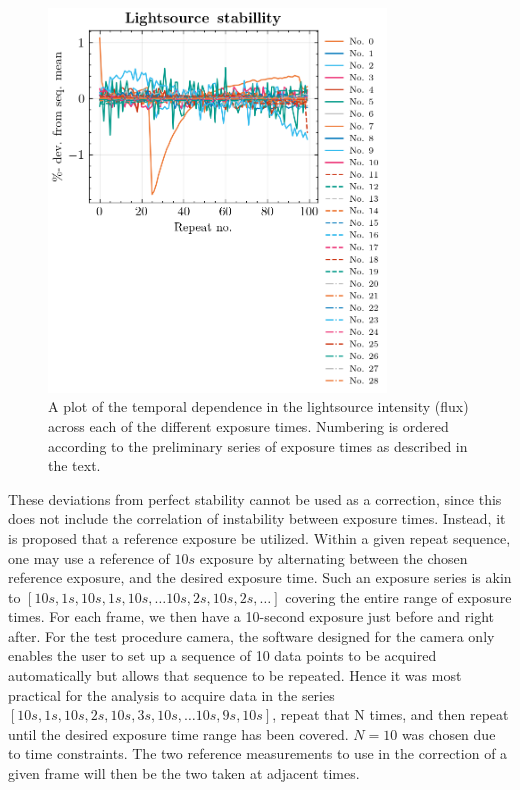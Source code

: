 \documentclass[../main.tex]{subfiles}
\begin{document}
		\begin{figure}
			\centering			\includegraphics[width=0.8\textwidth]{lightsource.png}
			\caption{A plot of the temporal dependence in the lightsource intensity (flux) across each of the different exposure times. Numbering is ordered according to the preliminary series of exposure times as described in the text.}
			\label{fig:lightsourcestability}
		\end{figure}
		
		These deviations from perfect stability cannot be used as a correction, since this does not include the correlation of instability between exposure times. Instead, it is proposed that a reference exposure be utilized. Within a given repeat sequence, one may use a reference of $10s$ exposure by alternating between the chosen reference exposure, and the desired exposure time. Such an exposure series is akin to $[10s, 1s, 10s, 1s, 10s, \dots 10s, 2s, 10s, 2s,\dots]$ covering the entire range of exposure times. For each frame, we then have a 10-second exposure just before and right after. For the test procedure camera, the software designed for the camera only enables the user to set up a sequence of 10 data points to be acquired automatically but allows that sequence to be repeated. Hence it was most practical for the analysis to acquire data in the series $[10s, 1s, 10s, 2s, 10s, 3s, 10s, \dots 10s, 9s, 10s]$, repeat that N times, and then repeat until the desired exposure time range has been covered. $N=10$ was chosen due to time constraints. The two reference measurements to use in the correction of a given frame will then be the two taken at adjacent times. 
		
\end{document}
